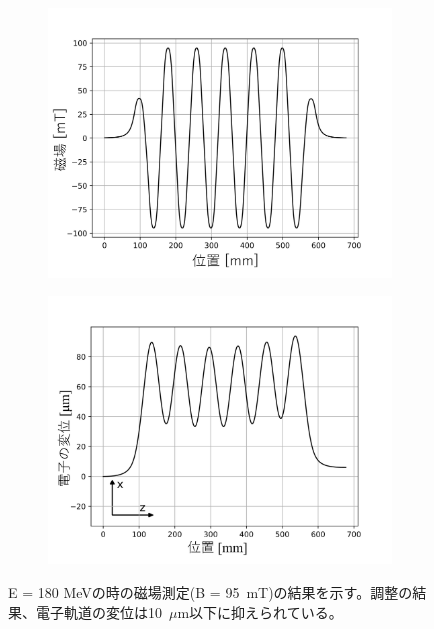 \documentclass[a4paper,11pt,uplatex]{jsbook}
\begin{document}
\begin{figure}
  \centering
  \begin{subfigure}[h]{0.45\linewidth}
    \centering
    \includegraphics[width=\linewidth]{image/3-undulator_filed.png}
  \end{subfigure}
  \hfill
  \begin{subfigure}[h]{0.45\linewidth}
    \centering
    \includegraphics[width=\linewidth]{image/3-undulator_position.png}
  \end{subfigure}
  \caption[ホールプローブによる磁場測定の結果]{E = 180 MeVの時の磁場測定(B = 95~mT)の結果を示す。調整の結果、電子軌道の変位は10~$\mu$m以下に抑えられている。}
\end{figure}
\end{document}
